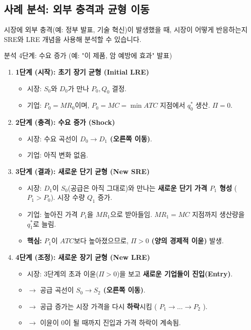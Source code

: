 \documentclass[11pt,a4paper]{article}
\theoremstyle{definition}
\begin{document}
\subsection{사례 분석: 외부 충격과 균형 이동}

시장에 외부 충격(예: 정부 발표, 기술 혁신)이 발생했을 때, 시장이 어떻게 반응하는지 SRE와 LRE 개념을 사용해 분석할 수 있습니다.

\begin{mybox}{분석 4단계: 수요 증가 (예: "이 제품, 암 예방에 효과" 발표)}
\begin{enumerate}
    \item \textbf{1단계 (시작): 초기 장기 균형 (Initial LRE)}
    \begin{itemize}
        \item 시장: $S_0$와 $D_0$가 만나 $P_0, Q_0$ 결정.
        \item 기업: $P_0 = MR_0$이며, $P_0 = MC = \min ATC$ 지점에서 $q_0^*$ 생산. \textbf{$\Pi = 0$}.
    \end{itemize}
    \item \textbf{2단계 (충격): 수요 증가 (Shock)}
    \begin{itemize}
        \item 시장: 수요 곡선이 \textbf{$D_0 \to D_1$ (오른쪽 이동)}.
        \item 기업: 아직 변화 없음.
    \end{itemize}
    \item \textbf{3단계 (결과): 새로운 단기 균형 (New SRE)}
    \begin{itemize}
        \item 시장: $D_1$이 $S_0$(공급은 아직 그대로)와 만나는 \textbf{새로운 단기 가격 $P_1$ 형성} ($P_1 > P_0$). 시장 수량 $Q_1$ 증가.
        \item 기업: 높아진 가격 $P_1$을 $MR_1$으로 받아들임. $MR_1 = MC$ 지점까지 생산량을 $q_1^*$로 늘림.
        \item \textbf{핵심:} $P_1$이 $ATC$보다 높아졌으므로, \textbf{$\Pi > 0$ (양의 경제적 이윤)} 발생.
    \end{itemize}
    \item \textbf{4단계 (조정): 새로운 장기 균형 (New LRE)}
    \begin{itemize}
        \item 시장: 3단계의 초과 이윤($\Pi > 0$)을 보고 \textbf{새로운 기업들이 진입(Entry)}.
        \item $\to$ 공급 곡선이 \textbf{$S_0 \to S_2$ (오른쪽 이동)}.
        \item $\to$ 공급 증가는 시장 가격을 다시 \textbf{하락}시킴 ( $P_1 \to \dots \to P_2$ ).
        \item $\to$ 이윤이 0이 될 때까지 진입과 가격 하락이 계속됨.
    \end{itemize}
\end{enumerate}


\end{mybox}
\end{document}
